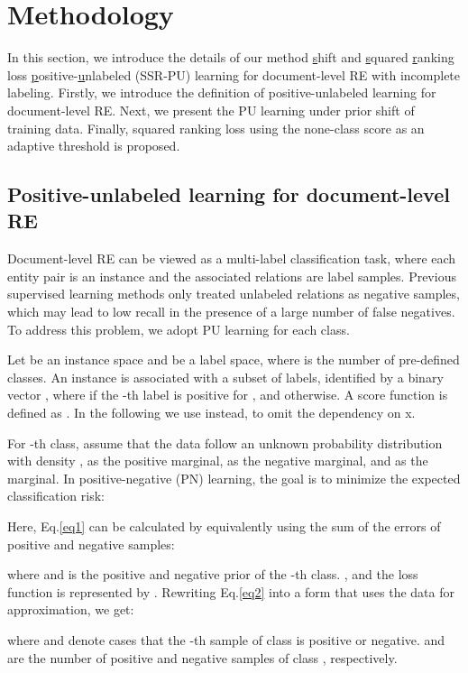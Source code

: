 \documentclass[11pt]{article}
\begin{document}
\section{Methodology}

In this section, we introduce the details of our method \underline{s}hift and \underline{s}quared \underline{r}anking loss \underline{p}ositive-\underline{u}nlabeled (SSR-PU) learning for document-level RE with incomplete labeling. Firstly, we introduce the definition of positive-unlabeled learning for document-level RE. Next, we present the PU learning under prior shift of training data. Finally, squared ranking loss using the none-class score as an adaptive threshold is proposed.

\subsection{Positive-unlabeled learning for document-level RE}

Document-level RE can be viewed as a multi-label classification task, where each entity pair is an instance and the associated relations are label samples. Previous supervised learning methods only treated unlabeled relations as negative samples, which may lead to low recall in the presence of a large number of false negatives. To address this problem, we adopt PU learning \citep{NIPS2014_35051070,pmlr-v37-plessis15} for each class.

Let  be an instance space and  be a label space, where  is the number of pre-defined classes. An instance  is associated with a subset of labels, identified by a binary vector , where  if the -th label is positive for , and  otherwise. A score function is defined as . In the following we use  instead, to omit the dependency on x. 

For -th class, assume that the data follow an unknown probability distribution with density ,  as the positive marginal,  as the negative marginal, and  as the marginal. In positive-negative (PN) learning, the goal is to minimize the expected classification risk:

Here, Eq.\ref{eq1} can be calculated by equivalently using the sum of the errors of positive and negative samples:

where  and  is the positive and negative prior of the -th class. ,  and the loss function is represented by . Rewriting Eq.\ref{eq2} into a form that uses the data for approximation, we get:


where  and  denote cases that the -th sample of class  is positive or negative.  and  are the number of positive and negative samples of class , respectively.
\end{document}
